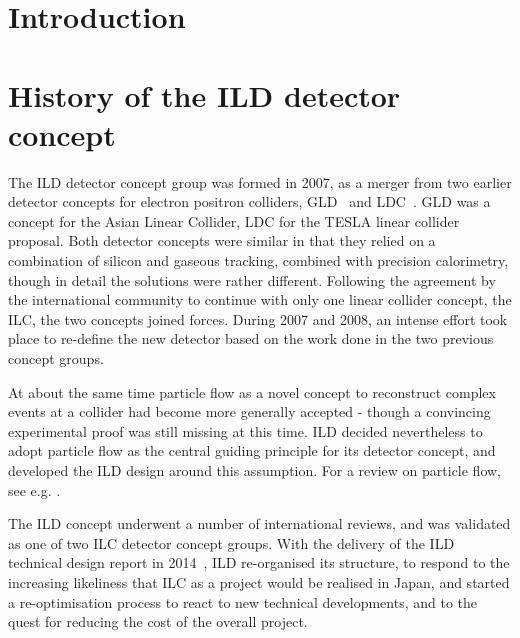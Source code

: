 \documentclass[%
 amsmath,amssymb,
 aps,
]{revtex4-1}
\begin{document}


\maketitle
\tableofcontents

\newpage

\section{\label{sec:level1}Introduction}

\section{History of the ILD detector concept}
The ILD detector concept group was formed in 2007, as a merger from two earlier detector concepts for electron positron colliders, GLD~\cite{ild:bib:ref-gld} and LDC~\cite{ild:bib:ref-ldc}. GLD was a concept for the Asian Linear Collider, LDC for the TESLA linear collider proposal. Both detector concepts were similar in that they relied on a combination of silicon and gaseous tracking, combined with precision calorimetry, though in detail the solutions were rather different. Following the agreement by the international community to continue with only one linear collider concept, the ILC, the two concepts joined forces. During 2007 and 2008, an intense effort took place to re-define the new detector based on the work done in the two previous concept groups. 

At about the same time particle flow as a novel concept to reconstruct complex events at a collider had become more generally accepted - though a convincing experimental proof was still missing at this time. ILD decided nevertheless to adopt particle flow as the central guiding principle for its detector concept, and developed the ILD design around this assumption. For a review on particle flow, see e.g. \cite{ild:bib:PandoraPFA}.

The ILD concept underwent a number of international reviews, and was validated as one of two ILC detector concept groups. With the delivery of the ILD technical design report in 2014~\cite{Behnke:2013lya}, ILD re-organised its structure, to respond to the increasing likeliness that ILC as a project would be realised in Japan, and started a re-optimisation process to react to new technical developments, and to the quest for reducing the cost of the overall project. 
\end{document}
